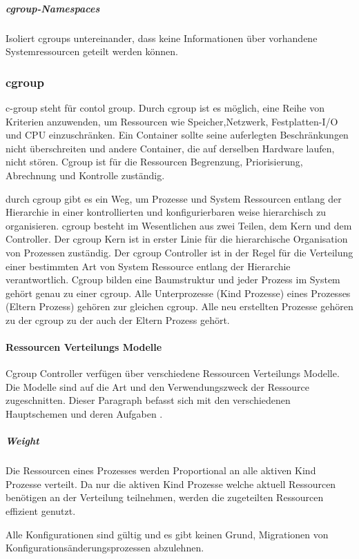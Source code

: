 \subparagraph{cgroup-Namespaces}
Isoliert cgroups untereinander, dass keine Informationen über vorhandene Systemressourcen geteilt werden können.



\subsubsection{cgroup}
\glqq c-group\grqq{} steht für \glqq contol group\grqq{}. Durch cgroup ist es möglich, eine Reihe von Kriterien anzuwenden, um Ressourcen wie Speicher,Netzwerk, Festplatten-I/O und CPU einzuschränken. Ein Container sollte seine auferlegten Beschränkungen nicht überschreiten und andere Container, die auf derselben Hardware laufen, nicht stören. Cgroup ist für die Ressourcen Begrenzung, Priorisierung, Abrechnung und Kontrolle zuständig.

durch cgroup gibt es ein Weg, um Prozesse und System Ressourcen entlang der Hierarchie in einer kontrollierten und konfigurierbaren weise hierarchisch zu organisieren. cgroup besteht im Wesentlichen aus zwei Teilen, dem Kern und dem Controller. Der cgroup Kern ist in erster Linie für die hierarchische Organisation von Prozessen zuständig. Der cgroup Controller ist in der Regel für die Verteilung einer bestimmten Art von System Ressource entlang der Hierarchie verantwortlich. Cgroup bilden eine Baumstruktur und jeder Prozess im System gehört genau zu einer cgroup. Alle Unterprozesse (Kind Prozesse) eines Prozesses (Eltern Prozess) gehören zur gleichen cgroup. Alle neu erstellten Prozesse gehören zu der cgroup zu der auch der Eltern Prozess gehört.\cite{Heo2015ControlV2} 


\paragraph{Ressourcen Verteilungs Modelle}
Cgroup Controller verfügen über verschiedene Ressourcen Verteilungs Modelle. Die Modelle sind auf die Art und den Verwendungszweck der Ressource zugeschnitten. Dieser Paragraph befasst sich mit den verschiedenen Hauptschemen und deren Aufgaben \cite{Heo2015ControlV2}.

\subparagraph{Weight}
Die Ressourcen eines Prozesses werden Proportional an alle aktiven Kind Prozesse verteilt. Da nur die aktiven Kind Prozesse welche aktuell Ressourcen benötigen an der Verteilung teilnehmen, werden die zugeteilten Ressourcen effizient genutzt. 

Alle Konfigurationen sind gültig und es gibt keinen Grund, Migrationen von Konfigurationsänderungsprozessen abzulehnen.

